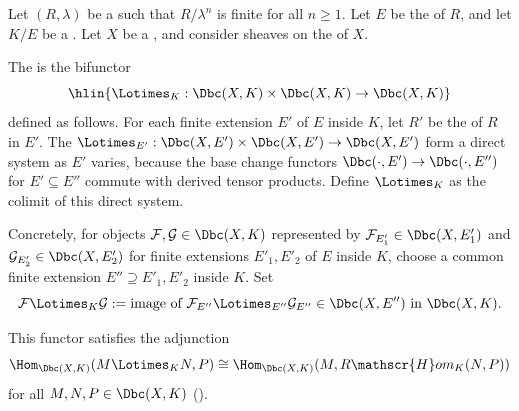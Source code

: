 \begin{definition} \label{definition:derived_tensor_product_on_bdd_constructible_complexes_with_algebraic_coefficients_on_a_noetherian_scheme}
    Let $(R, \lambda)$ be a   such that $R/\lambda^n$ is finite for all $n \geq 1$. Let $E$ be the  of $R$, and let $K/E$ be a . Let $X$ be a , and consider sheaves on the  of $X$.

    The  is the bifunctor
    $$\hlin{\Lotimes_K : \Dbc(X, K) \times \Dbc(X, K) \to \Dbc(X, K)}$$
    defined as follows. For each finite extension $E'$ of $E$ inside $K$, let $R'$ be the  of $R$ in $E'$. The  $\Lotimes_{E'}: \Dbc(X, E') \times \Dbc(X, E') \to \Dbc(X, E')$ form a direct system as $E'$ varies, because the base change functors $\Dbc(\cdot, E') \to \Dbc(\cdot, E'')$ for $E' \subseteq E''$ commute with derived tensor products. Define $\Lotimes_K$ as the colimit of this direct system.

    Concretely, for objects $\mathcal{F}, \mathcal{G} \in \Dbc(X, K)$ represented by $\mathcal{F}_{E'_1} \in \Dbc(X, E'_1)$ and $\mathcal{G}_{E'_2} \in \Dbc(X, E'_2)$ for finite extensions $E'_1, E'_2$ of $E$ inside $K$, choose a common finite extension $E'' \supseteq E'_1, E'_2$ inside $K$. Set
    $$\mathcal{F} \Lotimes_K \mathcal{G} := \text{image of } \mathcal{F}_{E''} \Lotimes_{E''} \mathcal{G}_{E''} \in \Dbc(X, E'') \text{ in } \Dbc(X, K).$$

    This functor satisfies the adjunction
    $$\Hom_{\Dbc(X,K)}(M \Lotimes_K N, P) \cong \Hom_{\Dbc(X,K)}(M, R\mathscr{H}om_K(N,P))$$
    for all $M,N,P \in \Dbc(X, K)$ ().
\end{definition}
